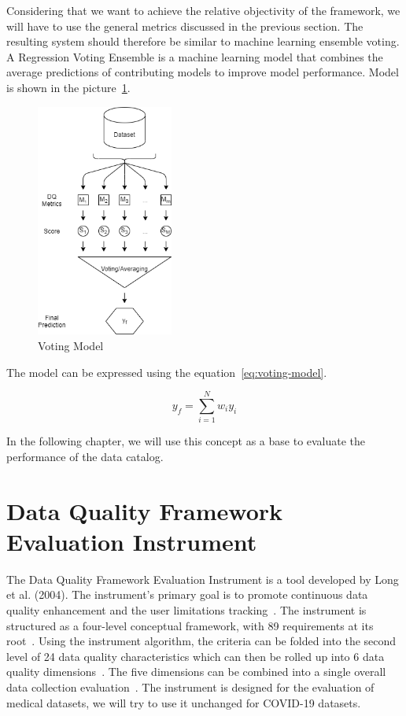 Considering that we want to achieve the relative objectivity of the framework, we will have to use the general metrics discussed in the previous section.
The resulting system should therefore be similar to machine learning ensemble voting.
A Regression Voting Ensemble is a machine learning model that combines the average predictions of contributing models to improve model performance.
Model is shown in the picture~\ref{fig:voting}.

\begin{figure}[htb]
    \centering
    \includegraphics[width=0.4\textwidth]{figures/voting.png}
    \caption{Voting Model}
    \label{fig:voting}
\end{figure}
\FloatBarrier

The model can be expressed using the equation~\ref{eq:voting-model}.

\begin{equation}\label{eq:voting-model}
    y_f = \sum_{i = 1}^{N} w_i y_i
\end{equation}

In the following chapter, we will use this concept as a base to evaluate the performance of the data catalog.

\section{Data Quality Framework Evaluation Instrument}

The Data Quality Framework Evaluation Instrument is a tool developed by Long et al. (2004).
The instrument's primary goal is to promote continuous data quality enhancement and the user limitations tracking~\cite{long2004}.
The instrument is structured as a four-level conceptual framework, with 89 requirements at its root~\cite{long2004}.
Using the instrument algorithm, the criteria can be folded into the second level of 24 data quality characteristics which can then be rolled up into 6 data quality dimensions~\cite{long2004}.
The five dimensions can be combined into a single overall data collection evaluation~\cite{long2004}.
The instrument is designed for the evaluation of medical datasets, we will try to use it unchanged for COVID-19 datasets.

